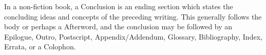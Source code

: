 In a non-fiction book, a Conclusion is an ending section which states the concluding ideas and concepts of the preceding writing. This generally follows the body or perhaps a Afterword, and the conclusion may be followed by an Epilogue, Outro, Postscript, Appendix/Addendum, Glossary, Bibliography, Index, Errata, or a Colophon.

